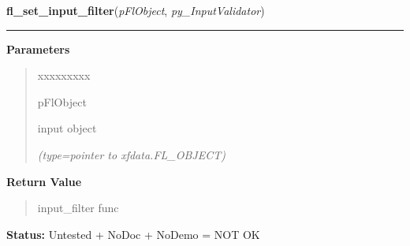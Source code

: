 \hspace{.8\funcindent}\begin{boxedminipage}{\funcwidth}

    \raggedright \textbf{fl\_set\_input\_filter}(\textit{pFlObject}, \textit{py\_InputValidator})

    \vspace{-1.5ex}

    \rule{\textwidth}{0.5\fboxrule}
\setlength{\parskip}{2ex}
\setlength{\parskip}{1ex}
      \textbf{Parameters}
      \vspace{-1ex}

      \begin{quote}
        \begin{Ventry}{xxxxxxxxx}

          \item[pFlObject]

          input object

            {\it (type=pointer to xfdata.FL\_OBJECT)}

        \end{Ventry}

      \end{quote}

      \textbf{Return Value}
    \vspace{-1ex}

      \begin{quote}
      input\_filter func

      \end{quote}

\textbf{Status:} Untested + NoDoc + NoDemo = NOT OK



    \end{boxedminipage}

    \label{xformslib:flinput:fl_validate_input}

    \vspace{0.5ex}


